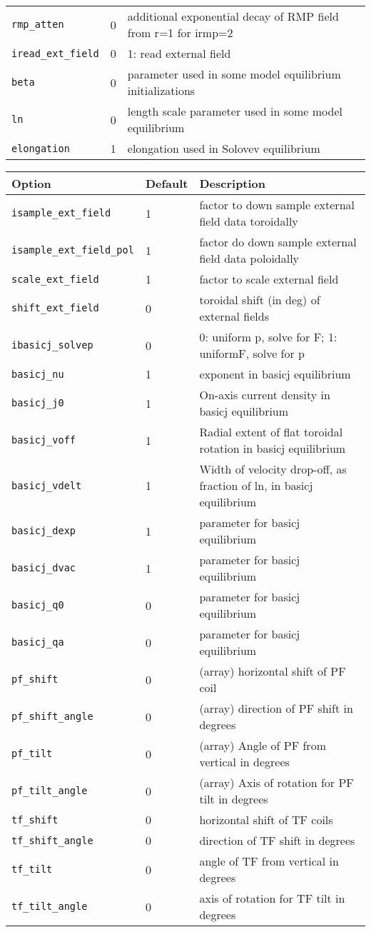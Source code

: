 \begin{tabular}{llp{4in}}
 \texttt{rmp\_atten}  &  0  & additional exponential decay of RMP field from r=1 for irmp=2 \\
 \texttt{iread\_ext\_field} & 0 & 1: read external field \\
 \texttt{beta}  & 0 & parameter used in some model equilibrium initializations \\
 \texttt{ln} & 0 & length scale parameter used in some model equilibrium \\
 \texttt{elongation} & 1 & elongation used in Solovev equilibrium

\end{tabular}

\begin{tabular}{llp{4in}}
  \textbf{Option}&\textbf{Default}&\textbf{Description}\\
  \hline

 \texttt{isample\_ext\_field} & 1 & factor to down sample external field data toroidally \\
 \texttt{isample\_ext\_field\_pol} & 1 & factor do down sample external field data poloidally \\
 \texttt{scale\_ext\_field} & 1 & factor to scale external field \\
 \texttt{shift\_ext\_field} & 0 & toroidal shift (in deg) of external fields \\
 \texttt{ibasicj\_solvep} & 0 & 0: uniform p, solve for F; 1: uniformF, solve for p \\
 \texttt{basicj\_nu} &1 & exponent in basicj equilibrium \\
 \texttt{basicj\_j0} & 1 & On-axis current density in basicj equilibrium \\
 \texttt{basicj\_voff} & 1 & Radial extent of flat toroidal rotation in basicj equilibrium \\
 \texttt{basicj\_vdelt} & 1 & Width of velocity drop-off, as fraction of ln, in basicj equilibrium \\
 \texttt{basicj\_dexp} & 1 & parameter for basicj equilibrium \\
 \texttt{basicj\_dvac} & 1 & parameter for basicj equilibrium \\
 \texttt{basicj\_q0} & 0 &   parameter for basicj equilibrium \\
 \texttt{basicj\_qa}  & 0 &   parameter for basicj equilibrium \\
 \texttt{pf\_shift} & 0 & (array) horizontal shift of PF coil \\
 \texttt{pf\_shift\_angle} & 0 & (array) direction of PF shift in degrees \\
 \texttt{pf\_tilt} & 0 & (array) Angle of PF from vertical in degrees \\
 \texttt{pf\_tilt\_angle} & 0 & (array) Axis of rotation for PF tilt in degrees \\
 \texttt{tf\_shift} & 0 & horizontal shift of TF coils \\
 \texttt{tf\_shift\_angle} & 0 & direction of TF shift in degrees \\
 \texttt{tf\_tilt} & 0 & angle of TF from vertical in degrees \\
 \texttt{tf\_tilt\_angle} & 0 & axis of rotation for TF tilt in degrees 


\end{tabular}
